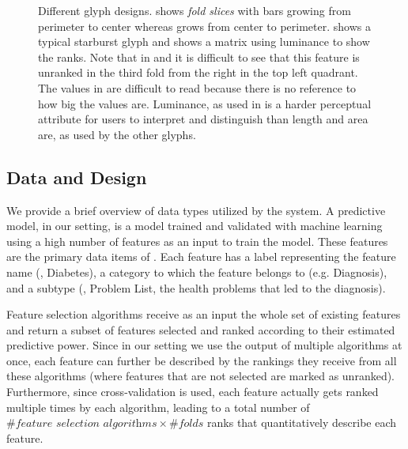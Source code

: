 \begin{figure}[t]
\begin{subfigure}{0.23\linewidth}
\caption{}
\label{subfig:matrix}
\end{subfigure}%
\caption[Different glyph designs.]{
Different glyph designs.
 shows \emph{fold slices} with bars growing from perimeter to center
whereas  grows from center to perimeter.
 shows a typical starburst glyph and
 shows a matrix using luminance to show the ranks.
Note that in  and  it is difficult
to see that this feature is unranked in the third fold from the right in
the top left quadrant.
The values in  are difficult to read because
there is no reference to how big the values are.
Luminance, as used in  is a harder perceptual attribute for users
to interpret and distinguish than length and area are, as used by the other glyphs.
}
\label{fig:glyph_design}
\end{figure}

\subsection{Data and Design}

We provide a brief overview of data types utilized by the system. A predictive model, in our setting, is a model trained and validated with machine learning using a high number of features as an input to train the model. These features are the primary data items of \infuse. Each feature has a label representing the feature name (\eg, Diabetes), a category to which the feature belongs to (e.g. Diagnosis), and a subtype (\eg, Problem List, the health problems that led to the diagnosis).

Feature selection algorithms receive as an input the whole set of existing features and return a subset of features selected and ranked according to their estimated predictive power. Since in our setting we use the output of multiple algorithms at once, each feature can further be described by the rankings they receive from all these algorithms (where features that are not selected are marked as unranked). Furthermore, since cross-validation is used, each feature actually gets ranked multiple times by each algorithm, leading to a total number of $\#\textit{feature selection algorithms} \times \#\textit{folds}$ ranks that quantitatively describe each feature.



